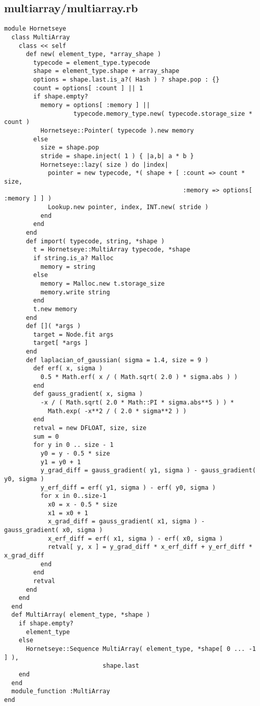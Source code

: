 \subsection{multiarray/multiarray.rb}\label{cha:multiarray-multiarray-rb}
\begin{lstlisting}
module Hornetseye
  class MultiArray
    class << self
      def new( element_type, *array_shape )
        typecode = element_type.typecode
        shape = element_type.shape + array_shape
        options = shape.last.is_a?( Hash ) ? shape.pop : {}
        count = options[ :count ] || 1
        if shape.empty?
          memory = options[ :memory ] ||
                   typecode.memory_type.new( typecode.storage_size * count )
          Hornetseye::Pointer( typecode ).new memory
        else
          size = shape.pop
          stride = shape.inject( 1 ) { |a,b| a * b }
          Hornetseye::lazy( size ) do |index|
            pointer = new typecode, *( shape + [ :count => count * size,
                                                 :memory => options[ :memory ] ] )
            Lookup.new pointer, index, INT.new( stride )
          end
        end
      end
      def import( typecode, string, *shape )
        t = Hornetseye::MultiArray typecode, *shape
        if string.is_a? Malloc
          memory = string
        else
          memory = Malloc.new t.storage_size
          memory.write string
        end
        t.new memory
      end
      def []( *args )
        target = Node.fit args
        target[ *args ]
      end
      def laplacian_of_gaussian( sigma = 1.4, size = 9 )
        def erf( x, sigma )
          0.5 * Math.erf( x / ( Math.sqrt( 2.0 ) * sigma.abs ) )
        end
        def gauss_gradient( x, sigma )
          -x / ( Math.sqrt( 2.0 * Math::PI * sigma.abs**5 ) ) *
            Math.exp( -x**2 / ( 2.0 * sigma**2 ) )
        end
        retval = new DFLOAT, size, size
        sum = 0
        for y in 0 .. size - 1
          y0 = y - 0.5 * size
          y1 = y0 + 1
          y_grad_diff = gauss_gradient( y1, sigma ) - gauss_gradient( y0, sigma )
          y_erf_diff = erf( y1, sigma ) - erf( y0, sigma )
          for x in 0..size-1
            x0 = x - 0.5 * size
            x1 = x0 + 1
            x_grad_diff = gauss_gradient( x1, sigma ) - gauss_gradient( x0, sigma )
            x_erf_diff = erf( x1, sigma ) - erf( x0, sigma )
            retval[ y, x ] = y_grad_diff * x_erf_diff + y_erf_diff * x_grad_diff
          end
        end
        retval
      end
    end
  end
  def MultiArray( element_type, *shape )
    if shape.empty?
      element_type
    else
      Hornetseye::Sequence MultiArray( element_type, *shape[ 0 ... -1 ] ),
                           shape.last
    end
  end
  module_function :MultiArray
end
\end{lstlisting}
